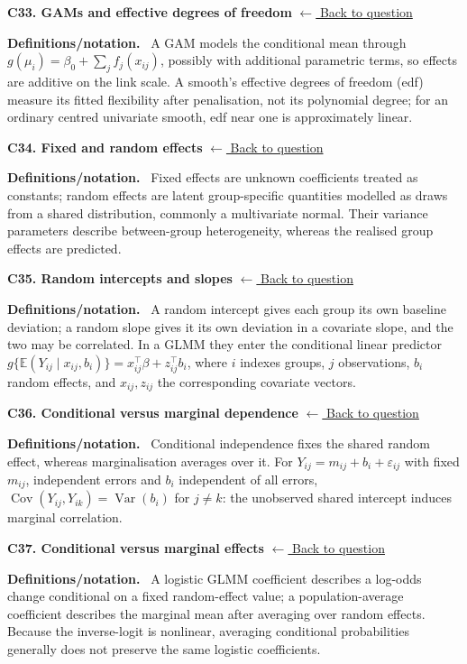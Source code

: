 \documentclass[11pt,a4paper]{article}
\newcommand{\E}{\mathbb{E}}
\newcommand{\concepttopic}[1]{%
  \par\addvspace{8pt}\noindent{\color{statblue}\bfseries #1}\par\nobreak\smallskip}
\newenvironment{conceptanswer}[2]
  {\par\addvspace{10pt}\noindent\begin{minipage}{\linewidth}%
   \hypertarget{concept-answer:#1}{}%
   \textcolor{statblue}{\textbf{C#1. #2}}\hfill%
   {\footnotesize\hyperlink{concept-question:#1}{$\leftarrow$ Back to question}}%
   \par\smallskip\textbf{Definitions/notation.}\ }
  {\end{minipage}\par}
\begin{document}
\begin{conceptanswer}{33}{GAMs and effective degrees of freedom}
A GAM models the conditional mean through
$g(\mu_i)=\beta_0+\sum_j f_j(x_{ij})$, possibly with additional
parametric terms, so effects are additive on the link scale.
A smooth's effective degrees of freedom (edf) measure its fitted
flexibility after penalisation, not its polynomial degree; for an
ordinary centred univariate smooth, edf near one is approximately linear.
\end{conceptanswer}

\concepttopic{Mixed models}
\begin{conceptanswer}{34}{Fixed and random effects}
Fixed effects are unknown coefficients treated as constants;
random effects are latent group-specific quantities modelled as draws
from a shared distribution, commonly a multivariate normal.
Their variance parameters describe between-group heterogeneity,
whereas the realised group effects are predicted.
\end{conceptanswer}

\begin{conceptanswer}{35}{Random intercepts and slopes}
A random intercept gives each group its own baseline deviation;
a random slope gives it its own deviation in a covariate slope,
and the two may be correlated.
In a GLMM they enter the conditional linear predictor
$g\{\E(Y_{ij}\mid x_{ij},b_i)\}=x_{ij}^\top\beta+z_{ij}^\top b_i$,
where $i$ indexes groups, $j$ observations, $b_i$ random effects,
and $x_{ij},z_{ij}$ the corresponding covariate vectors.
\end{conceptanswer}

\begin{conceptanswer}{36}{Conditional versus marginal dependence}
Conditional independence fixes the shared random effect, whereas
marginalisation averages over it.
For $Y_{ij}=m_{ij}+b_i+\varepsilon_{ij}$ with fixed $m_{ij}$,
independent errors and $b_i$ independent of all errors,
$\operatorname{Cov}(Y_{ij},Y_{ik})=\operatorname{Var}(b_i)$ for $j\ne k$:
the unobserved shared intercept induces marginal correlation.
\end{conceptanswer}

\begin{conceptanswer}{37}{Conditional versus marginal effects}
A logistic GLMM coefficient describes a log-odds change conditional
on a fixed random-effect value; a population-average coefficient
describes the marginal mean after averaging over random effects.
Because the inverse-logit is nonlinear, averaging conditional
probabilities generally does not preserve the same logistic
coefficients.
\end{conceptanswer}
\end{document}
